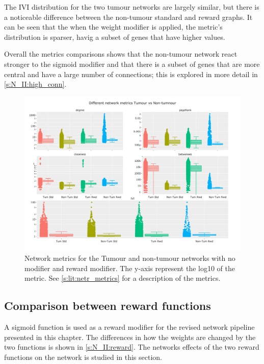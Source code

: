 The IVI distribution for the two tumour networks are largely similar, but there is a noticeable difference between the non-tumour standard and reward graphs. It can be seen that the when the weight modifier is applied, the metric's distribution is sparser, havig a subset of genes that have higher values.

Overall the metrics comparisons shows that the non-tumour network react stronger to the sigmoid modifier and that there is a subset of genes that are more central and have a large number of connections; this is explored in more detail in \cref{s:N_II:high_conn}.

\begin{figure}[!htb]    
    \centering
    \includegraphics[width=1.0\textwidth,height=0.7\textheight,keepaspectratio]{Sections/Network_II/validation/network_comparison.png}
    \caption{Network metrics for the Tumour and non-tumour networks with no modifier and reward modifier. The y-axis represent the log10 of the metric.  See \cref{s:lit:netr_metrics} for a description of the metrics. }
    \label{fig:N_II:net_metrics_comp}
\end{figure}


\subsection{Comparison between reward functions} \label{s:N_II:reward_comp}



A sigmoid function is used as a reward modifier for the revised network pipeline presented in this chapter. The differences in how the weights are changed by the two functions is shown in \cref{s:N_II:reward}. The networks effects of the two reward functions on the network is studied in this section.

